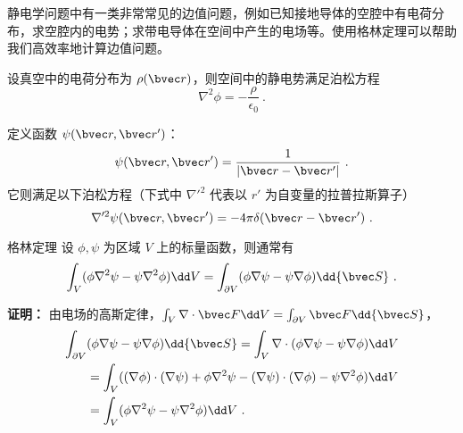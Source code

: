 

静电学问题中有一类非常常见的边值问题，例如已知接地导体的空腔中有电荷分布，求空腔内的电势；求带电导体在空间中产生的电场等。使用格林定理可以帮助我们高效率地计算边值问题。

设真空中的电荷分布为 $\rho(\bvec r)$，则空间中的静电势满足泊松方程
\begin{equation}\label{eq_EleGr_1}
\nabla^2 \phi = -\frac{\rho}{\epsilon_0}~.
\end{equation}

定义函数 $\psi(\bvec r,\bvec r')$：
\begin{equation}
\psi(\bvec r,\bvec r')=\frac{1}{|\bvec r-\bvec r'|}~.
\end{equation}
它则满足以下泊松方程（下式中 $\nabla'^2$ 代表以 $r'$ 为自变量的拉普拉斯算子）
\begin{equation}\label{eq_EleGr_2}
\nabla'^2 \psi(\bvec r,\bvec r')=-4\pi\delta(\bvec r-\bvec r')~.
\end{equation}

\begin{theorem}{格林定理}
设 $\phi,\psi$ 为区域 $V$ 上的标量函数，则通常有
\begin{equation}\label{eq_EleGr_3}
\int_V (\phi \nabla^2 \psi -\psi\nabla^2\phi)\dd V=\int_{\partial V}(\phi \nabla \psi-\psi\nabla\phi)\dd {\bvec S} ~.
\end{equation}
\end{theorem}
\textbf{证明：} 由电场的高斯定律，$\int_V \nabla\cdot \bvec F\dd V=\int_{\partial V}\bvec F \dd {\bvec S}$，
\begin{equation}
\begin{aligned}
\int_{\partial V}&(\phi\nabla\psi-\psi\nabla\phi)\dd{\bvec S}=\int_V \nabla \cdot (\phi\nabla\psi-\psi\nabla\phi)\dd V\\
&=\int_V((\nabla\phi)\cdot(\nabla\psi)+\phi\nabla^2\psi-(\nabla\psi)\cdot(\nabla\phi)-\psi\nabla^2\phi)\dd V\\
&=\int_V(\phi\nabla^2\psi-\psi\nabla^2\phi)\dd V~.
\end{aligned}
\end{equation}

